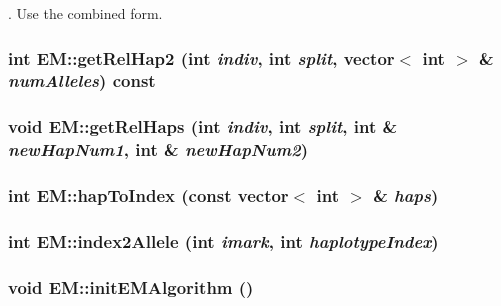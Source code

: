. Use the combined form. 

\hypertarget{classEM_a8a03279b3b78e8f88add021a28b7ac28}{
\subsubsection[{getRelHap2}]{\setlength{\rightskip}{0pt plus 5cm}int EM::getRelHap2 (int {\em indiv}, \/  int {\em split}, \/  vector$<$ int $>$ \& {\em numAlleles}) const}}
\label{classEM_a8a03279b3b78e8f88add021a28b7ac28}
\hypertarget{classEM_af63a611b10a4a1bbe15b2013d2c72b45}{
\subsubsection[{getRelHaps}]{\setlength{\rightskip}{0pt plus 5cm}void EM::getRelHaps (int {\em indiv}, \/  int {\em split}, \/  int \& {\em newHapNum1}, \/  int \& {\em newHapNum2})}}
\label{classEM_af63a611b10a4a1bbe15b2013d2c72b45}
\hypertarget{classEM_a3e6b256bb2996b1903f5a2490540659b}{
\subsubsection[{hapToIndex}]{\setlength{\rightskip}{0pt plus 5cm}int EM::hapToIndex (const vector$<$ int $>$ \& {\em haps})}}
\label{classEM_a3e6b256bb2996b1903f5a2490540659b}
\hypertarget{classEM_abdb50dc221b573b78c2c9785b2ae7f9b}{
\subsubsection[{index2Allele}]{\setlength{\rightskip}{0pt plus 5cm}int EM::index2Allele (int {\em imark}, \/  int {\em haplotypeIndex})}}
\label{classEM_abdb50dc221b573b78c2c9785b2ae7f9b}
\hypertarget{classEM_a8531164d0fa92217eb0c7d9f75382912}{
\subsubsection[{initEMAlgorithm}]{\setlength{\rightskip}{0pt plus 5cm}void EM::initEMAlgorithm ()}}

